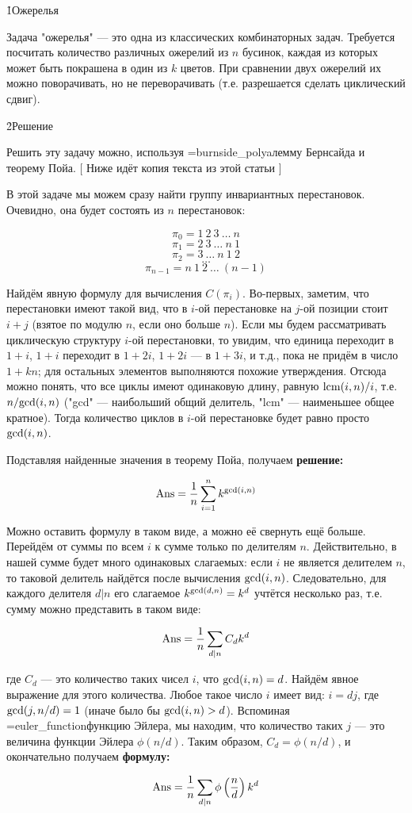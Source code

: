 \h1{Ожерелья}

Задача "ожерелья" --- это одна из классических комбинаторных задач. Требуется посчитать количество различных ожерелий из $n$ бусинок, каждая из которых может быть покрашена в один из $k$ цветов. При сравнении двух ожерелий их можно поворачивать, но не переворачивать (т.е. разрешается сделать циклический сдвиг).

\h2{Решение}

Решить эту задачу можно, используя \algohref=burnside_polya{лемму Бернсайда и теорему Пойа}. [ Ниже идёт копия текста из этой статьи ]

В этой задаче мы можем сразу найти группу инвариантных перестановок. Очевидно, она будет состоять из $n$ перестановок:

$$ \pi_0 = 1\ 2\ 3\ \ldots\ n $$
$$ \pi_1 = 2\ 3\ \ldots\ n\ 1 $$
$$ \pi_2 = 3\ \ldots\ n\ 1\ 2 $$
$$ \ldots $$
$$ \pi_{n-1} = n\ 1\ 2\ \ldots\ (n-1) $$

Найдём явную формулу для вычисления $C(\pi_i)$. Во-первых, заметим, что перестановки имеют такой вид, что в $i$-ой перестановке на $j$-ой позиции стоит $i+j$ (взятое по модулю $n$, если оно больше $n$). Если мы будем рассматривать циклическую структуру $i$-ой перестановки, то увидим, что единица переходит в $1+i$, $1+i$ переходит в $1+2i$, $1+2i$ --- в $1+3i$, и т.д., пока не придём в число $1 + kn$; для остальных элементов выполняются похожие утверждения. Отсюда можно понять, что все циклы имеют одинаковую длину, равную ${\rm lcm}(i,n) / i$, т.е. $n / {\rm gcd}(i,n)$ ("gcd" --- наибольший общий делитель, "lcm" --- наименьшее общее кратное). Тогда количество циклов в $i$-ой перестановке будет равно просто ${\rm gcd}(i,n)$.

Подставляя найденные значения в теорему Пойа, получаем \bf{решение}:

$$ {\rm Ans} = \frac{1}{n} \sum_{i=1}^{n} k ^ {{\rm gcd}(i,n)} $$

Можно оставить формулу в таком виде, а можно её свернуть ещё больше. Перейдём от суммы по всем $i$ к сумме только по делителям $n$. Действительно, в нашей сумме будет много одинаковых слагаемых: если $i$ не является делителем $n$, то таковой делитель найдётся после вычисления ${\rm gcd}(i,n)$. Следовательно, для каждого делителя $d|n$ его слагаемое $k^{{\rm gcd}(d,n)} = k^d$ учтётся несколько раз, т.е. сумму можно представить в таком виде:

$$ {\rm Ans} = \frac{1}{n} \sum_{d|n} C_d k^d $$

где $C_d$ --- это количество таких чисел $i$, что ${\rm gcd}(i,n) = d$. Найдём явное выражение для этого количества. Любое такое число $i$ имеет вид: $i=dj$, где ${\rm gcd}(j,n/d) = 1$ (иначе было бы ${\rm gcd}(i,n) > d$). Вспоминая \algohref=euler_function{функцию Эйлера}, мы находим, что количество таких $j$ --- это величина функции Эйлера $\phi(n/d)$. Таким образом, $C_d = \phi(n/d)$, и окончательно получаем \bf{формулу}:

$$ {\rm Ans} = \frac{1}{n} \sum_{d|n} \phi \left( \frac{n}{d} \right) k^d $$

